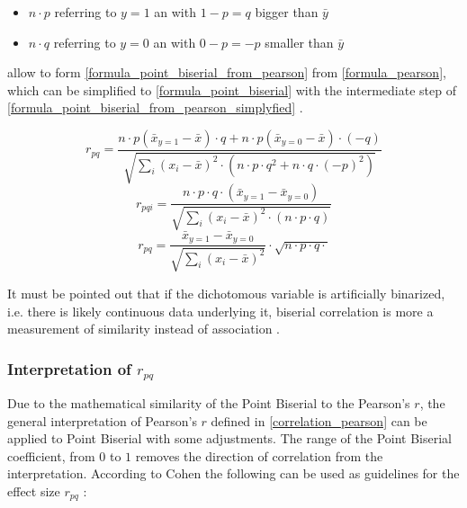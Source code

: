 \begin{itemize}
	\item $n \cdot p$ referring to $y=1$ an with $1 - p = q$ bigger than $\bar{y}$
	\item $n \cdot q$ referring to $y=0$ an with $0 - p = -p$ smaller than $\bar{y}$
\end{itemize}
allow to form \cref{formula_point_biserial_from_pearson} from \cref{formula_pearson}, which can be simplified to \cref{formula_point_biserial} with the intermediate step of \cref{formula_point_biserial_from_pearson_simplyfied} \parencite{Tate1954,CohenWest2003,Bortz2004,DeJesus2019}.

\smallskip

\begin{equation}
	\label{formula_point_biserial_from_pearson}
	r_{pq} =  \frac{n \cdot p (\bar{x}_{y=1}-\bar{x}) \cdot q + n \cdot p (\bar{x}_{y=0}-\bar{x}) \cdot (-q)}{\sqrt{\sum_{i}{(x_i-\bar{x})^2} \cdot (n \cdot p \cdot q^2 + n \cdot q \cdot (-p)^2)}}
\end{equation}
\begin{equation}
	\label{formula_point_biserial_from_pearson_simplyfied}
	r_{pqi} =  \frac{n \cdot p \cdot q \cdot (\bar{x}_{y=1}-\bar{x}_{y=0})}{\sqrt{\sum_{i}{(x_i-\bar{x})^2} \cdot (n \cdot p \cdot q)}}
\end{equation}
\begin{equation}
	\label{formula_point_biserial}
	r_{pq} =  \frac{\bar{x}_{y=1}-\bar{x}_{y=0}}{\sqrt{\sum_{i}{(x_i-\bar{x})^2}}} \cdot \sqrt{n \cdot p \cdot q \cdot} 
\end{equation}

\smallskip

It must be pointed out that if the dichotomous variable is artificially binarized, i.e. there is likely continuous data underlying it, biserial correlation is more a measurement of similarity instead of association \parencite{OTSD2020}.

\subsubsection{Interpretation of $r_{pq}$}
Due to the mathematical similarity of the Point Biserial to the Pearson's $r$, the general interpretation of Pearson's $r$ defined in \cref{correlation_pearson} can be applied to Point Biserial with some adjustments. The range of the Point Biserial coefficient, from $0$ to $1$ removes the direction of correlation from the interpretation. According to Cohen \parencite{Cohen1988} the following can be used as guidelines for the effect size $r_{pq}$ \parencite{Leblanc2017}:

